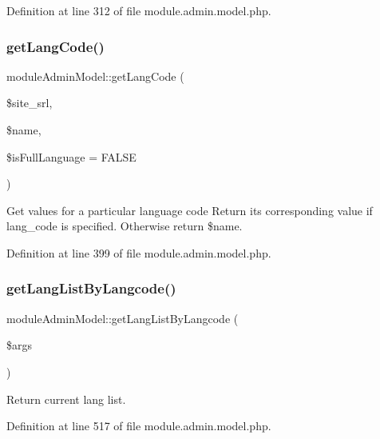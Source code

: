 Definition at line 312 of file module.\+admin.\+model.\+php.

\hypertarget{classmoduleAdminModel_aa10dc8b8645165816c43f140c57b546b}{}\label{classmoduleAdminModel_aa10dc8b8645165816c43f140c57b546b} 
\subsubsection{\texorpdfstring{get\+Lang\+Code()}{getLangCode()}}
{\footnotesize\ttfamily module\+Admin\+Model\+::get\+Lang\+Code (\begin{DoxyParamCaption}\item[{}]{\$site\+\_\+srl,  }\item[{}]{\$name,  }\item[{}]{\$is\+Full\+Language = {\ttfamily FALSE} }\end{DoxyParamCaption})}



Get values for a particular language code Return its corresponding value if lang\+\_\+code is specified. Otherwise return \$name. 



Definition at line 399 of file module.\+admin.\+model.\+php.

\hypertarget{classmoduleAdminModel_a425b28af6d0f27c2306191d7a4abdbaa}{}\label{classmoduleAdminModel_a425b28af6d0f27c2306191d7a4abdbaa} 
\subsubsection{\texorpdfstring{get\+Lang\+List\+By\+Langcode()}{getLangListByLangcode()}}
{\footnotesize\ttfamily module\+Admin\+Model\+::get\+Lang\+List\+By\+Langcode (\begin{DoxyParamCaption}\item[{}]{\$args }\end{DoxyParamCaption})}



Return current lang list. 



Definition at line 517 of file module.\+admin.\+model.\+php.

